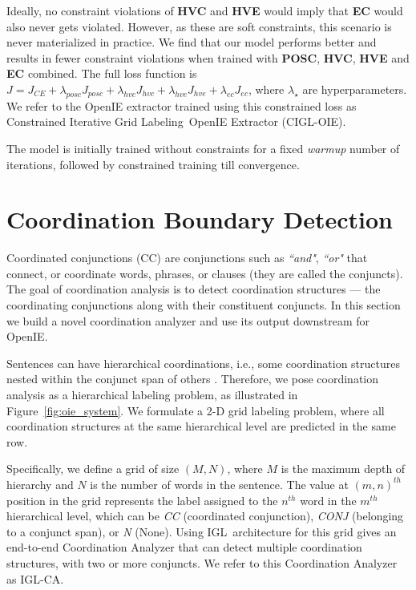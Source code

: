 \documentclass[11pt,a4paper]{article}
\newcommand{\shortname}{{\scshape IGL}}
\newcommand{\longname}{Iterative Grid Labeling}
\begin{document}
Ideally, no constraint violations of \textbf{HVC} and \textbf{HVE} would imply that \textbf{EC} would also never gets violated. However, as these are soft constraints, this scenario is never materialized in practice. We find that our model performs better and results in fewer constraint violations when trained with \textbf{POSC}, \textbf{HVC}, \textbf{HVE} and \textbf{EC} combined. The full loss function is $J = J_{CE}+\lambda_{posc}  J_{posc}+\lambda_{hvc} J_{hvc}+\lambda_{hve} J_{hve}+\lambda_{ec} J_{ec}$, where $\lambda_\star$ are hyperparameters. We refer to the OpenIE extractor trained using this constrained loss as Constrained \longname\ OpenIE Extractor (C\shortname-OIE).

The model is initially trained without constraints for a fixed \textit{warmup} number of iterations, followed by constrained training till convergence. 
\section{Coordination Boundary Detection}
\label{sec:conjunctions}
Coordinated conjunctions (CC) are conjunctions such as \textit{``and"}, \textit{``or"} that connect, or coordinate words, phrases, or clauses (they  are called the conjuncts). The goal of coordination analysis is to detect  coordination structures --- the coordinating conjunctions along with their constituent conjuncts. In this section we build a novel coordination analyzer and use its output downstream for OpenIE.

Sentences can have hierarchical coordinations, i.e., some coordination structures nested within the conjunct span of others \cite{saha&mausam18}.
Therefore, we pose coordination analysis as a hierarchical labeling problem, as illustrated in Figure~\ref{fig:oie_system}. We formulate a 2-D grid labeling problem, where all coordination structures at the same hierarchical level are predicted in the same row.

Specifically, we define a grid of size $(M, N)$, where $M$ is the maximum depth of hierarchy and $N$ is the number of words in the sentence. The value at $(m,n)^{th}$ position in the grid represents the label assigned to the $n^{th}$ word in the $m^{th}$ hierarchical level, which can be \textit{CC} (coordinated conjunction), \textit{CONJ} (belonging to a conjunct span), or \textit{N} (None). 
Using \shortname\ architecture for this grid gives an end-to-end Coordination Analyzer that can detect multiple coordination structures, with two or more conjuncts. We refer to this Coordination Analyzer as \shortname-CA.  
\end{document}
